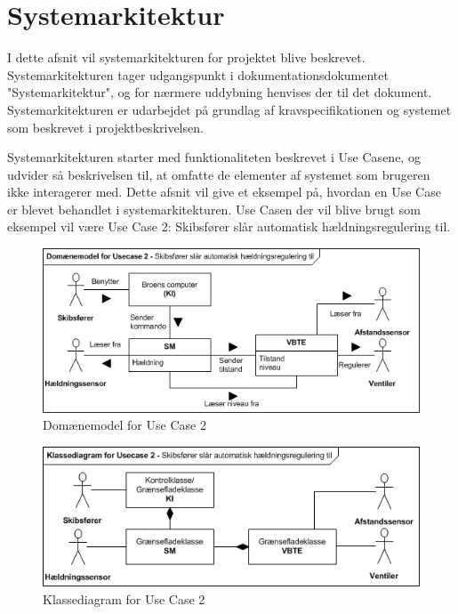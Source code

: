 \section{Systemarkitektur}
\label{ch:systemarkitektur}
I dette afsnit vil systemarkitekturen for projektet blive beskrevet. Systemarkitekturen tager udgangspunkt i dokumentationsdokumentet "Systemarkitektur", og for nærmere uddybning henvises der til det dokument. 
Systemarkitekturen er udarbejdet på grundlag af kravspecifikationen og systemet som beskrevet i projektbeskrivelsen.

Systemarkitekturen starter med funktionaliteten beskrevet i Use Casene, og udvider så beskrivelsen til, at omfatte de elementer af systemet som brugeren ikke interagerer med. Dette afsnit vil give et eksempel på, hvordan en Use Case er blevet behandlet i systemarkitekturen. Use Casen der vil blive brugt som eksempel vil være Use Case 2: Skibsfører slår automatisk hældningsregulering til.

\begin{figure}[H]
\centering
\includegraphics[scale=0.8]{billeder/Systemarkitektur/DM_UC2}
\caption{Domænemodel for Use Case 2}
\label{fig:dmuc2}
\end{figure}

\begin{figure}[H]
\centering
\includegraphics[scale=0.8]{billeder/Systemarkitektur/KD_UC2}
\caption{Klassediagram for Use Case 2}
\label{fig:kduc2}
\end{figure}

